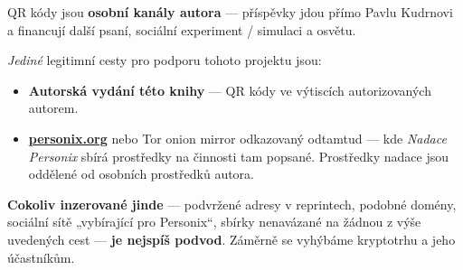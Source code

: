 \begin{minipage}[t]{0.60\textwidth}
\vspace{0pt}
\begin{mdframed}[
  linewidth=0.7pt,roundcorner=5pt,
  innerleftmargin=10pt,innerrightmargin=10pt,
  innertopmargin=8pt,innerbottommargin=8pt,
  skipabove=0pt,skipbelow=0pt,
  linecolor=cbwarning!50,backgroundcolor=cbwarning!5,
  nobreak=true,
  needspace=4\baselineskip,
]
\footnotesize
QR kódy jsou \textbf{osobní kanály autora} --- příspěvky jdou přímo Pavlu Kudrnovi a financují další psaní, sociální experiment / simulaci a osvětu.

\smallskip
\emph{Jediné} legitimní cesty pro podporu tohoto projektu jsou:

\smallskip
\begin{itemize}
\setlength{\itemsep}{0pt}
\setlength{\topsep}{0pt}
\item \textbf{Autorská vydání této knihy} --- QR kódy ve výtiscích autorizovaných autorem.
\item \href{https://personix.org}{\textbf{personix.org}} nebo Tor onion mirror odkazovaný odtamtud --- kde \emph{Nadace Personix} sbírá prostředky na činnosti tam popsané. Prostředky nadace jsou oddělené od osobních prostředků autora.
\end{itemize}

\smallskip
\textbf{Cokoliv inzerované jinde} --- podvržené adresy v reprintech, podobné domény, sociální sítě „vybírající pro Personix“, sbírky nenavázané na žádnou z výše uvedených cest --- \textbf{je nejspíš podvod}. Záměrně se vyhýbáme kryptotrhu a jeho účastníkům.
\end{mdframed}
\end{minipage}

\clearpage

